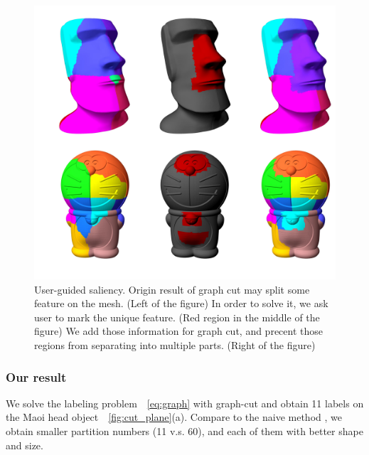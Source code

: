 \begin{figure}[ht]
\centering
\includegraphics[width=1.0\linewidth]{figs/saliency.pdf} 
\caption{User-guided saliency. 
Origin result of graph cut may split some feature on the mesh. (Left of the figure) In order to solve it, we ask user to mark the unique feature. (Red region in the middle of the figure) We add those information for graph cut, and precent those regions from separating into multiple parts. (Right of the figure)} 
\label{fig:saliency}
\end{figure}

\subsubsection{Our result}
We solve the labeling problem~\eqname~\ref{eq:graph} with graph-cut and obtain 11 labels on the Maoi head object~\figname~\ref{fig:cut_plane}(a).
Compare to the naive method %
, we obtain  smaller partition numbers (11 v.s. 60), and each of them  with better shape and size.

